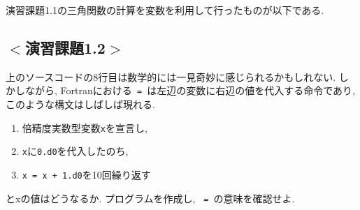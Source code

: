 演習課題1.1の三角関数の計算を変数を利用して行ったものが以下である.



\subsection*{$<$演習課題1.2$>$}
上のソースコードの8行目は数学的には一見奇妙に感じられるかもしれない.
しかしながら, Fortranにおける\verb| = |は左辺の変数に右辺の値を代入する命令であり,
このような構文はしばしば現れる.
\begin{enumerate}
\item 倍精度実数型変数\verb|x|を宣言し,
\item \verb|x|に\verb|0.d0|を代入したのち,
\item \verb|x = x + 1.d0|を10回繰り返す
\end{enumerate}
とxの値はどうなるか.
プログラムを作成し, \verb| = |の意味を確認せよ.
\newline


\begin{comment}
\subsection*{より汎用的な電卓プログラムの作成}
画面上で二つの数値x, yを読み取り, それらをそのまま画面上に表示するプログラムの例を以下に示す.

このプログラムを実行すると, x, yという二つの数値の入力待ちとなるため,
キーボードから任意の数字を入力する.
x=1.2, y=3.14を入力するには,
\begin{Verbatim}[frame=single]
1.2 3.14
\end{Verbatim}
のようにスペースまたは,
\begin{Verbatim}[frame=single]
1.2
3.14
\end{Verbatim}
のようにエンターで区切る.

write文とread文の括弧の中の6と5は,
それぞれ標準出力, 標準入力と呼ばれ, コマンドプロンプトの画面上での入出力を意味する. \\


次に, 画面上で二つの数値x, yを読み取り, それらの和, 差, 積, 商を計算するプログラムを以下に示す.

和差積商はそれぞれ記号$+-*/$で表される.
\\

最後に, 二つの数値をファイルから入力するように変更したプログラムを以下に示す.

プログラムの実行にあたっては, あらかじめ``input.dat''という入力ファイルを準備しておく必要がある.
メモ帳を用いて, ファイル``input.dat''をソースコードと同じフォルダ内に作成し, 例えば次のように入力しておくこと.
\begin{Verbatim}[frame=single]
1.2 3.14
\end{Verbatim}
\end{comment}

